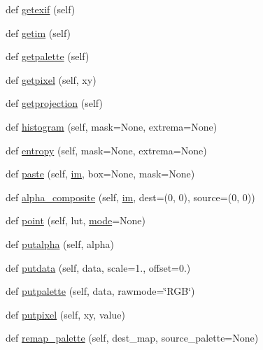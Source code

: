 \begin{DoxyCompactItemize}
\item 
def \hyperlink{classPIL_1_1Image_1_1Image_aa8672dd3a153fd33a39d9fb0ef3a62f0}{getexif} (self)
\item 
def \hyperlink{classPIL_1_1Image_1_1Image_aba23a726014c5d3cbe1cdb200eaaf7cf}{getim} (self)
\item 
def \hyperlink{classPIL_1_1Image_1_1Image_a1d358ff0a66b7b84250b7432345318e8}{getpalette} (self)
\item 
def \hyperlink{classPIL_1_1Image_1_1Image_ac10d83c16e92c702f4e92615cc17d88f}{getpixel} (self, xy)
\item 
def \hyperlink{classPIL_1_1Image_1_1Image_ab56365cd15a36d786cfe5fc76fb5b69b}{getprojection} (self)
\item 
def \hyperlink{classPIL_1_1Image_1_1Image_a57c61ae60c45eaaf38778e044223d350}{histogram} (self, mask=None, extrema=None)
\item 
def \hyperlink{classPIL_1_1Image_1_1Image_aca9ca36ba53c98fcdacf785b3a50afb3}{entropy} (self, mask=None, extrema=None)
\item 
def \hyperlink{classPIL_1_1Image_1_1Image_aa6597671ba43a60f779a1cb4e884a75d}{paste} (self, \hyperlink{classPIL_1_1Image_1_1Image_ad64d536d671d37d388fc8896f9d493b8}{im}, box=None, mask=None)
\item 
def \hyperlink{classPIL_1_1Image_1_1Image_aa82fac6927bcb106b907e0c1811f2c6a}{alpha\+\_\+composite} (self, \hyperlink{classPIL_1_1Image_1_1Image_ad64d536d671d37d388fc8896f9d493b8}{im}, dest=(0, 0), source=(0, 0))
\item 
def \hyperlink{classPIL_1_1Image_1_1Image_a4391dc1ad91dff0a36f00fffd05bdee6}{point} (self, lut, \hyperlink{classPIL_1_1Image_1_1Image_a7d372be82681ec344af8a7ba8dc84d5d}{mode}=None)
\item 
def \hyperlink{classPIL_1_1Image_1_1Image_ac95871b39e72a9f747470bf55e4fcec6}{putalpha} (self, alpha)
\item 
def \hyperlink{classPIL_1_1Image_1_1Image_a182ce6af4540d818751ffef15e9444bc}{putdata} (self, data, scale=1., offset=0.)
\item 
def \hyperlink{classPIL_1_1Image_1_1Image_a422af86026c6e881f1274d13cc8cd8ca}{putpalette} (self, data, rawmode=\char`\"{}R\+GB\char`\"{})
\item 
def \hyperlink{classPIL_1_1Image_1_1Image_ad07506275e6f2f42cfa1cce74c7a8066}{putpixel} (self, xy, value)
\item 
def \hyperlink{classPIL_1_1Image_1_1Image_ac89a462dfa9a2c7bb0cf3a8f73a806de}{remap\+\_\+palette} (self, dest\+\_\+map, source\+\_\+palette=None)

\end{DoxyCompactItemize}
